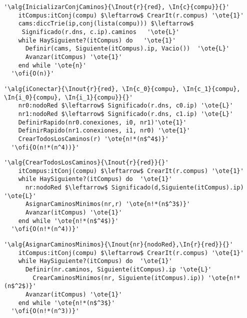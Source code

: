 \begin{lstlisting}[mathescape]
  '\alg{InicializarConjCaminos}{\Inout{r}{red}, \In{c}{compu}}{}'
    itCompus:itConj(compu) $\leftarrow$ CrearIt(r.compus) '\ote{1}'
    cams:diccTrie(ip,conj(lista(compu))) $\leftarrow$
     Significado(r.dns, c.ip).caminos   '\ote{L}'
    while HaySiguiente?(itCompus) do   '\ote{1}'                                                 
      Definir(cams, Siguiente(itCompus).ip, Vacio())  '\ote{L}'
      Avanzar(itCompus) '\ote{1}'
    end while '\ote{n}'
  '\ofi{O(n)}'
\end{lstlisting}

\begin{lstlisting}[mathescape]
  '\alg{iConectar}{\Inout{r}{red}, \In{c_0}{compu}, \In{c_1}{compu}, \In{i_0}{compu}, \In{i_1}{compu}}{}'
    nr0:nodoRed $\leftarrow$ Significado(r.dns, c0.ip) '\ote{L}'
    nr1:nodoRed $\leftarrow$ Significado(r.dns, c1.ip) '\ote{L}'
    DefinirRapido(nr0.conexiones, i0, nr1)'\ote{1}'
    DefinirRapido(nr1.conexiones, i1, nr0) '\ote{1}'
    CrearTodosLosCaminos(r) '\ote{n!*(n$^4$)}'
  '\ofi{O(n!*(n^4))}'
\end{lstlisting}

\begin{lstlisting}[mathescape]
  '\alg{CrearTodosLosCaminos}{\Inout{r}{red}}{}'
    itCompus:itConj(compu) $\leftarrow$ CrearIt(r.compus) '\ote{1}'
    while HaySiguiente?(itCompus) do  '\ote{1}'                                                  
      nr:nodoRed $\leftarrow$ Significado(d,Siguiente(itCompus).ip) '\ote{L}'
      AsignarCaminosMinimos(nr,r) '\ote{n!*(n$^3$)}'
      Avanzar(itCompus) '\ote{1}'
    end while '\ote{n!*(n$^4$)}'
  '\ofi{O(n!*(n^4))}'
\end{lstlisting}

\begin{lstlisting}[mathescape]
  '\alg{AsignarCaminosMinimos}{\Inout{nr}{nodoRed},\In{r}{red}}{}'
    itCompus:itConj(compu) $\leftarrow$ CrearIt(r.compus) '\ote{1}'
    while HaySiguiente?(itCompus) do  '\ote{1}'                                                
      Definir(nr.caminos, Siguiente(itCompus).ip '\ote{L}'
        CrearCaminosMinimos(nr, Siguiente(itCompus).ip)) '\ote{n!*(n$^2$)}'
      Avanzar(itCompus) '\ote{1}'
    end while '\ote{n!*(n$^3$}'
  '\ofi{O(n!*(n^3))}'
\end{lstlisting}

